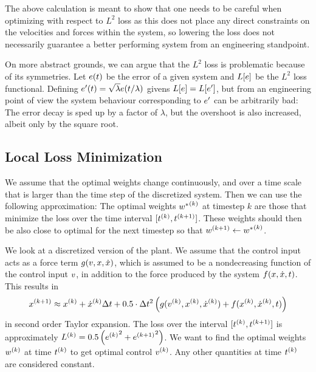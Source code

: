 \documentclass{article}
\begin{document}
    The above calculation is meant to show that one needs to be careful when optimizing 
    with respect to $L^2$ loss as this does not place any direct constraints on the 
    velocities and forces within the system, so lowering the loss does not necessarily
    guarantee a better performing system from an engineering standpoint.

    On more abstract grounds, we can argue that the $L^2$ loss is problematic because of its symmetries. Let $e(t)$ be
    the error of a given system and $L[e]$ be the $L^2$ loss functional. Defining 
    $e^\prime(t) = \sqrt{\lambda} e(t/\lambda)$ givens $L[e] = L[e^\prime]$, but from an 
    engineering point of view the system behaviour corresponding to $e^\prime$ can be arbitrarily bad: The error
    decay is sped up by a factor of $\lambda$, but the overshoot is also increased, albeit only by the square root. 



  \subsection{Local Loss Minimization}
    We assume that the optimal weights change continuously, and over a time scale that is 
    larger than the time step of the discretized system. Then we can use the following approximation: The optimal weights 
    ${w^*}^{(k)}$ at timestep $k$ are those that minimize the loss over the time interval $[{t}^{(k)}, {t}^{(k+1)}]$. 
    These weights should then be also close to optimal for the next timestep so that 
    ${w}^{(k+1)} \leftarrow {w^*}^{(k)}$.

    We look at a discretized version of the plant. 
    We assume that the control input acts as a force term $g(v, x, \dot{x})$, 
    which is assumed to be a nondecreasing function of the control input $v$,
    in addition to the force produced 
    by the system $f(x, \dot{x}, t)$. This results in
    \begin{align}
        {x}^{(k+1)} \approx {x}^{(k)} + {\dot{x}}^{(k)} \Delta t + 0.5 \cdot \Delta t^2 \left( g({v}^{(k)}, {x}^{(k)}, {\dot{x}}^{(k)}) + f({x}^{(k)}, {\dot{x}}^{(k)}, t) \right)
    \end{align}
    in second order Taylor expansion. The loss over the interval $[{t}^{(k)}, {t}^{(k+1)}]$ is approximately
    ${L}^{(k)} = 0.5 \left( {{e}^{(k)}}^2 + {{e}^{(k+1)}}^2 \right)$. 
    We want to find the optimal weights ${w}^{(k)}$ at time ${t}^{(k)}$ to get optimal control ${v}^{(k)}$. 
    Any other quantities at time ${t}^{(k)}$ are considered constant.
\end{document}
